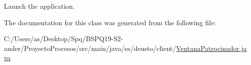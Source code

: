 Launch the application. 

The documentation for this class was generated from the following file\+:\begin{DoxyCompactItemize}
\item 
C\+:/\+Users/as/\+Desktop/\+Spq/\+B\+S\+P\+Q19-\/\+S2-\/ander/\+Proyecto\+Procesos/src/main/java/es/deusto/client/\mbox{\hyperlink{_ventana_patrocinador_8java}{Ventana\+Patrocinador.\+java}}\end{DoxyCompactItemize}
